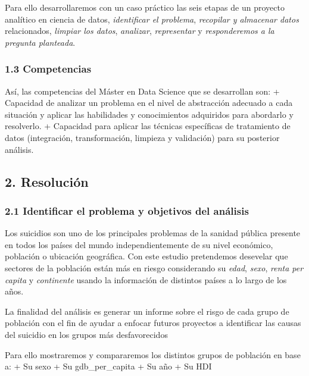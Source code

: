 \documentclass[]{article}
\begin{document}
Para ello desarrollaremos con un caso práctico las seis etapas de un
proyecto analítico en ciencia de datos, \emph{identificar el problema},
\emph{recopilar y almacenar datos} relacionados, \emph{limpiar los
datos}, \emph{analizar}, \emph{representar} y \emph{responderemos a la
pregunta planteada}.

\hypertarget{competencias}{%
\subsubsection{1.3 Competencias}\label{competencias}}

Así, las competencias del Máster en Data Science que se desarrollan son:
+ Capacidad de analizar un problema en el nivel de abstracción adecuado
a cada situación y aplicar las habilidades y conocimientos adquiridos
para abordarlo y resolverlo. + Capacidad para aplicar las técnicas
especíﬁcas de tratamiento de datos (integración, transformación,
limpieza y validación) para su posterior análisis.

\hypertarget{resolucion}{%
\subsection{2. Resolución}\label{resolucion}}

\hypertarget{identificar-el-problema-y-objetivos-del-analisis}{%
\subsubsection{2.1 Identificar el problema y objetivos del
análisis}\label{identificar-el-problema-y-objetivos-del-analisis}}

Los suicidios son uno de los principales problemas de la sanidad pública
presente en todos los países del mundo independientemente de su nivel
económico, población o ubicación geográfica. Con este estudio
pretendemos desevelar que sectores de la población están más en riesgo
considerando su \emph{edad}, \emph{sexo}, \emph{renta per capita} y
\emph{continente} usando la información de distintos países a lo largo
de los años.

La finalidad del análisis es generar un informe sobre el risgo de cada
grupo de población con el fin de ayudar a enfocar futuros proyectos a
identificar las causas del suicidio en los grupos más desfavorecidos

Para ello mostraremos y compararemos los distintos grupos de población
en base a: + Su sexo + Su gdb\_per\_capita + Su año + Su HDI
\end{document}

